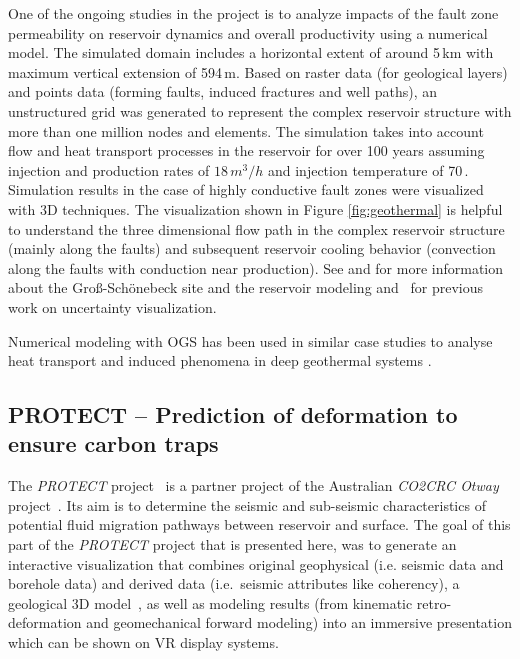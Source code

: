 \documentclass[twocolumn]{svjour3}          %
\begin{document}
One of the ongoing studies in the project is to analyze impacts of the fault zone permeability on reservoir dynamics and overall productivity using a numerical model. The simulated domain includes a horizontal extent of around 5\,km with maximum vertical extension of 594\,m. Based on raster data (for geological layers) and points data (forming faults, induced fractures and well paths), an unstructured grid was generated to represent the complex reservoir structure with more than one million nodes and elements. The simulation takes into account flow and heat transport processes in the reservoir for over 100 years assuming injection and production rates of $18\,m^3/h$ and injection temperature of 70\,\celsius. Simulation results in the case of highly conductive fault zones were visualized with 3D techniques. The visualization shown in Figure \ref{fig:geothermal} is helpful to understand the three dimensional flow path in the complex reservoir structure (mainly along the faults) and subsequent reservoir cooling behavior (convection along the faults with conduction near production). See \cite{zimmermann:geothermal} and \cite{bloecher:geothermal} for more information about the Gro{\ss}-Sch\"onebeck site and the reservoir modeling and~\cite{zehner:uncertainty} for previous work on uncertainty visualization.

Numerical modeling with OGS has been used in similar case studies to analyse heat transport and induced phenomena in deep geothermal systems \cite{Kolditz1993467, McDermott2006321, Watanabe2010263}.


\subsection{PROTECT -- Prediction of deformation to ensure carbon traps}
\label{otway-basin---co2-storage}

The \emph{PROTECT} project~\cite{krawczyk:deformation} is a partner project of the Australian \emph{CO2CRC Otway} project~\cite{cook:carbon}. Its aim is to determine the seismic and sub-seismic characteristics of potential fluid migration pathways between reservoir and surface. The goal of this part of the \emph{PROTECT} project that is presented here, was to generate an interactive visualization that combines original geophysical (i.e. seismic data and borehole data) and derived data (i.e.~seismic attributes like coherency), a geological 3D model~\cite{ziesch:geology}, as well as modeling results (from kinematic retro-deformation and geomechanical forward modeling) into an immersive presentation which can be shown on VR display systems.
\end{document}
